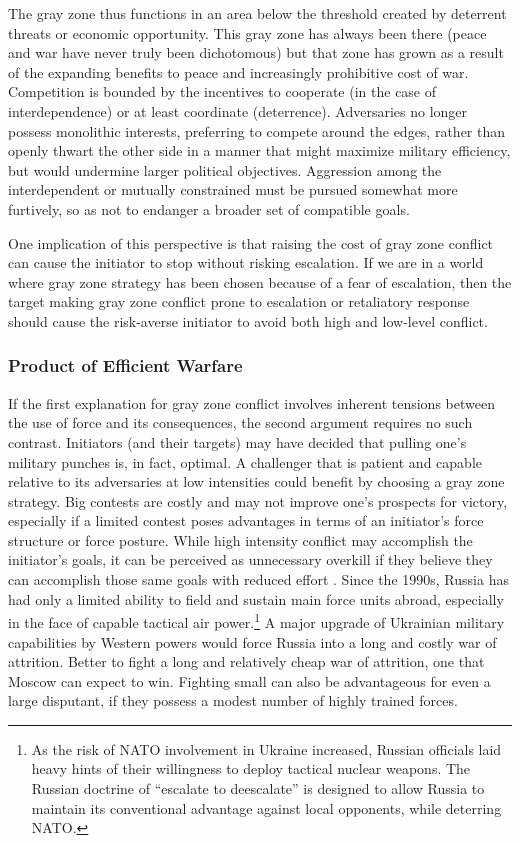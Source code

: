 \documentclass[12pt,letterpaper]{article}
\begin{document}
			The gray zone thus functions in an area below the threshold created by deterrent threats or economic opportunity. This gray zone has always been there (peace and war have never truly been dichotomous) but that zone has grown as a result of the expanding benefits to peace and increasingly prohibitive cost of war. Competition is bounded by the incentives to cooperate (in the case of interdependence) or at least coordinate (deterrence). Adversaries no longer possess monolithic interests, preferring to compete around the edges, rather than openly thwart the other side in a manner that might maximize military efficiency, but would undermine larger political objectives. Aggression among the interdependent or mutually constrained must be pursued somewhat more furtively, so as not to endanger a broader set of compatible goals.

			One implication of this perspective is that raising the cost of gray zone conflict can cause the initiator to stop without risking escalation. If we are in a world where gray zone strategy has been chosen because of a fear of escalation, then the target making gray zone conflict prone to escalation or retaliatory response should cause the risk-averse initiator to avoid both high and low-level conflict.
		
		\subsubsection{Product of Efficient Warfare}
			If the first explanation for gray zone conflict involves inherent tensions between the use of force and its consequences, the second argument requires no such contrast. Initiators (and their targets) may have decided that pulling one's military punches is, in fact, optimal.  A challenger that is patient and capable relative to its adversaries at low intensities could benefit by choosing a gray zone strategy. Big contests are costly and may not improve one's prospects for victory, especially if a limited contest poses advantages in terms of an initiator's force structure or force posture. While high intensity conflict may accomplish the initiator's goals, it can be perceived as unnecessary overkill if they believe they can accomplish those same goals with reduced effort \citep{altman_advancingattackingstrategic_2017}. Since the 1990s, Russia has had only a limited ability to field and sustain main force units abroad, especially in the face of capable tactical air power.\footnote{As the risk of NATO involvement in Ukraine increased, Russian officials laid heavy hints of their willingness to deploy tactical nuclear weapons. The Russian doctrine of ``escalate to deescalate'' is designed to allow Russia to maintain its conventional advantage against local opponents, while deterring NATO.}  A major upgrade of Ukrainian military capabilities by Western powers would force Russia into a long and costly war of attrition. Better to fight a long and relatively cheap war of attrition, one that Moscow can expect to win. Fighting small can also be advantageous for even a large disputant, if they possess a modest number of highly trained forces.   
			
\end{document}
